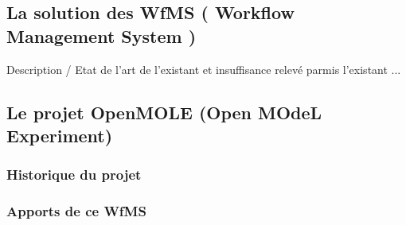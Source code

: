 \subsection{La solution des  WfMS ( Workflow Management System )}

Description / Etat de l'art de l'existant et insuffisance relevé parmis l'existant ...


\subsection{Le projet OpenMOLE (Open MOdeL Experiment)}

\subsubsection{Historique du projet}

\subsubsection{Apports de ce WfMS}

\stopcontents[chapters]


